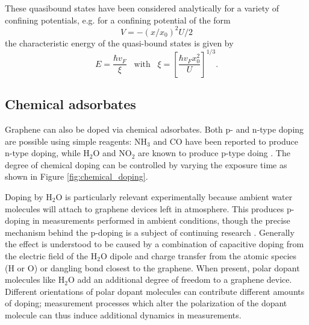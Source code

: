 \documentclass[edeposit,fullpage,draftthesis]{uiucthesis2009}
\begin{document}
        These quasibound states have been considered analytically for a variety of confining potentials, 
        e.g. for a confining potential of the form
        \begin{equation}
            V = -(x/x_0)^2 U / 2
        \end{equation}
        the characteristic energy of the quasi-bound states is given by \cite{silvestrov2007quantum}
        \begin{equation}
            E = \frac{\hbar v_F}{\xi} \;\;\; \text{with} \;\;\; \xi = \left[ \frac{\hbar v_F x_0^2}{U} \right]^{1/3}.
        \end{equation}
        
        \subsection{Chemical adsorbates}
       
        Graphene can also be doped via chemical adsorbates. Both p- and n-type doping are possible
        using simple reagents: NH$_3$ and CO have been reported to produce n-type doping,
        while H$_2$O and NO$_2$ are known to produce p-type doing \cite{schedin2007detection}.
        The degree of chemical doping can be controlled by varying the exposure time as shown in 
        Figure \ref{fig:chemical_doping}.
        
        Doping by H$_2$O is particularly relevant experimentally because ambient water molecules
        will attach to graphene devices left in atmosphere. This produces p-doping in measurements
        performed in ambient conditions, though the precise mechanism behind the p-doping is
        a subject of continuing research 
        \cite{leenaerts2008adsorption, Moser2008, wang2010hysteresis, Wehling2008, Sabio2008}.
        Generally the effect is understood to be caused by a combination of capacitive doping
        from the electric field of the H$_2$O dipole and charge transfer from the atomic
        species (H or O) or dangling bond closest to the graphene.
        When present, polar dopant molecules like H$_2$O add an additional degree of freedom to a graphene device. 
        Different orientations of polar dopant molecules can contribute different amounts of doping;
        measurement processes which alter the polarization of the dopant molecule can thus induce
        additional dynamics in measurements.
        
\end{document}
